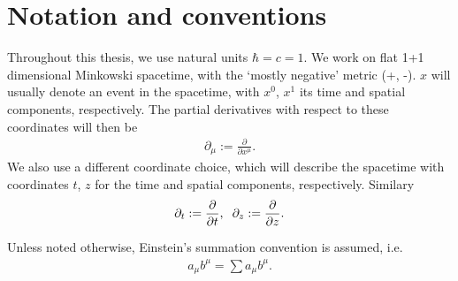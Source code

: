 %


\newpage
\section*{Notation and conventions}

Throughout this thesis, we use natural units $\hbar = c = 1$. We work on flat 1+1 dimensional Minkowski spacetime, with the `mostly negative' metric (+, -). $x$ will usually denote an event in the spacetime, with $x^{0}$, $x^{1}$ its time and spatial components, respectively. The partial derivatives with respect to these coordinates will then be 
\begin{align}
\partial_\mu := 	\frac{\partial}{\partial x^{\mu}}.
\end{align}
We also use a different coordinate choice,  which will describe the spacetime with coordinates $t$, $z$ for the time and spatial components, respectively. Similary 
\begin{align}
	\partial_t:= 	\frac{\partial}{\partial t}, \hspace{0.2cm}  \hfill
\partial_z:= 	\frac{\partial}{\partial z}.
\end{align}

Unless noted otherwise, Einstein's summation convention is assumed, i.e. 
\begin{align}
	a_\mu b^{\mu}= \sum a_\mu b^{\mu}.
\end{align}


